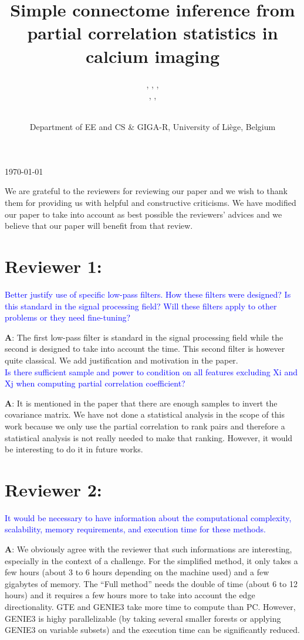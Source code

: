\documentclass[wcp]{jmlr}
\title{Simple connectome inference from partial correlation statistics in calcium imaging}
\author{\Name{Antonio Sutera},
   \Name{Arnaud Joly},
   \Name{Vincent François-Lavet}, \Email{a.sutera@ulg.ac.be}\\
   \Name{Zixiao Aaron Qiu},
   \Name{Gilles Louppe},
   \Name{Damien Ernst}\and\Name{Pierre Geurts}
    \\
   \addr Department of EE and CS \& GIGA-R, University of Li\`ege, Belgium}
\begin{document}
\maketitle
\begin{center}
\vspace{-1.5cm}
\today
\end{center}

We are grateful to the reviewers for reviewing our paper and we wish to thank them for providing us with helpful and constructive criticisms.
We have modified our paper to take into account as best possible the reviewers' advices and we believe that our paper will benefit from that review. 


\section*{Reviewer 1:}
\textcolor{blue}{
Better justify use of specific low-pass filters. How these filters were designed? Is this standard in the signal processing field? Will these filters apply to other problems or they need fine-tuning?}

\textbf{A}: The first low-pass filter is standard in the signal processing field while the second is designed to take into account the time. This second filter is however quite classical. We add justification and motivation in the paper.\\

\noindent
\textcolor{blue}{Is there sufficient sample and power to condition on all features excluding Xi and Xj when computing partial correlation coefficient?}

\textbf{A}: It is mentioned in the paper that there are enough samples to invert the covariance matrix. We have not done a statistical analysis in the scope of this work because we only use the partial correlation to rank pairs and therefore a statistical analysis is not really needed to make that ranking. However, it would be interesting to do it in future works.

\section*{Reviewer 2:}

\textcolor{blue}{It would be necessary to have information about the computational complexity, scalability, memory requirements, and execution time for these methods.}

\textbf{A}: We obviously agree with the reviewer that such informations are interesting, especially in the context of a challenge. For the simplified method, it only takes a few hours (about 3 to 6 hours depending on the machine used) and a few gigabytes of memory. The ``Full method'' needs the double of time (about 6 to 12 hours) and it requires a few hours more to take into account the edge directionality. GTE and GENIE3 take more time to compute than PC. However, GENIE3 is highy parallelizable (by taking several smaller forests or applying GENIE3 on variable subsets) and the execution time can be significantly reduced.
\end{document}
